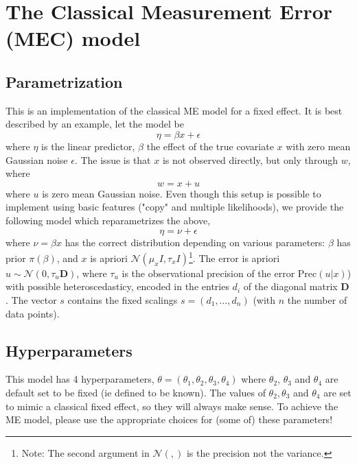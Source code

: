 \documentclass[a4paper,11pt]{article}
\begin{document}
\section*{The Classical Measurement Error (MEC) model}

\subsection*{Parametrization}

This is an implementation of the classical ME model for a fixed
effect. It is best described by an example, let the model be
\begin{displaymath}
\eta = \beta x + \epsilon{}
\end{displaymath}
where $\eta$ is the linear predictor, $\beta$ the effect of the true covariate
$x$ with zero mean Gaussian noise $\epsilon$. The issue is that $x$ is
not observed directly, but only through $w$, where
\begin{displaymath}
w = x + u
\end{displaymath}
where $u$ is zero mean Gaussian noise. Even though this setup is
possible to implement using basic features ("copy" and multiple
likelihoods), we provide the following model which reparametrizes the above,
\begin{displaymath}
\eta = \nu + \epsilon{}
\end{displaymath}
where $\nu=\beta x$ has the correct distribution depending on various parameters:
$\beta$ has prior $\pi(\beta)$, and $x$ is apriori ${\mathcal N}(\mu_{x}
{I}, \tau_{x} {I})$\footnote{Note:
The second argument in ${\mathcal N}(,)$ is the precision not the
variance.}. The error is apriori $u\sim\mathcal{N}(0,\tau_u \mathbf{D})$, where $\tau_u$ is the observational precision of the error $\text{Prec}(u|x)$) with possible heteroscedasticy, encoded in the entries $d_i$ of the diagonal matrix $\mathbf{D}$. The vector $s$ contains the fixed scalings $s=(d_1,\ldots,d_n)$ (with $n$ the number of data points).



\subsection*{Hyperparameters}

This model has 4 hyperparameters, $\theta = (\theta_{1}, \theta_{2},
\theta_{3}, \theta_{4})$ where $\theta_{2}$, $\theta_{3}$ and
$\theta_{4}$ are default set to be fixed (ie defined to be known). The
values of $\theta_{2}, \theta_{3}$ and $\theta_{4}$ are set to mimic a
classical fixed effect, so they will always make sense. To achieve the
ME model, please use the appropriate choices for
(some of) these parameters!
\end{document}
